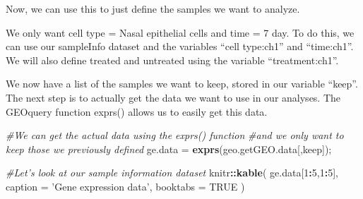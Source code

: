 \documentclass[
]{book}
\newenvironment{Shaded}{\begin{snugshade}}{\end{snugshade}}
\newcommand{\CommentTok}[1]{\textcolor[rgb]{0.56,0.35,0.01}{\textit{#1}}}
\newcommand{\DataTypeTok}[1]{\textcolor[rgb]{0.13,0.29,0.53}{#1}}
\newcommand{\DecValTok}[1]{\textcolor[rgb]{0.00,0.00,0.81}{#1}}
\newcommand{\KeywordTok}[1]{\textcolor[rgb]{0.13,0.29,0.53}{\textbf{#1}}}
\newcommand{\NormalTok}[1]{#1}
\newcommand{\OperatorTok}[1]{\textcolor[rgb]{0.81,0.36,0.00}{\textbf{#1}}}
\newcommand{\OtherTok}[1]{\textcolor[rgb]{0.56,0.35,0.01}{#1}}
\newcommand{\StringTok}[1]{\textcolor[rgb]{0.31,0.60,0.02}{#1}}
\begin{document}
Now, we can use this to just define the samples we want to analyze.

We only want cell type = Nasal epithelial cells and time = 7 day. To do this, we can use our sampleInfo dataset and the variables ``cell type:ch1'' and ``time:ch1''. We will also define treated and untreated using the variable ``treatment:ch1''.

\begin{Shaded}
\end{Shaded}

We now have a list of the samples we want to keep, stored in our variable ``keep''. The next step is to actually get the data we want to use in our analyses. The GEOquery function exprs() allows us to easily get this data.

\begin{Shaded}
\begin{Highlighting}[]
\CommentTok{#We can get the actual data using the exprs() function}
\CommentTok{#and we only want to keep those we previously defined}
\NormalTok{ge.data =}\StringTok{ }\KeywordTok{exprs}\NormalTok{(geo.getGEO.data[,keep]);}

\CommentTok{#Let's look at our sample information dataset}
\NormalTok{knitr}\OperatorTok{::}\KeywordTok{kable}\NormalTok{(}
\NormalTok{  ge.data[}\DecValTok{1}\OperatorTok{:}\DecValTok{5}\NormalTok{,}\DecValTok{1}\OperatorTok{:}\DecValTok{5}\NormalTok{], }\DataTypeTok{caption =} \StringTok{'Gene expression data'}\NormalTok{,}
  \DataTypeTok{booktabs =} \OtherTok{TRUE}
\NormalTok{)}
\end{Highlighting}
\end{Shaded}
\end{document}
